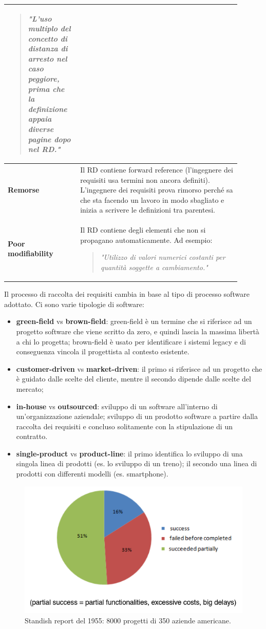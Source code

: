 \documentclass[italian]{article}
\begin{document}
\begin{longtable}{|m{0.27\linewidth}|m{0.63\linewidth}|}
\begin{verse}
				\textit{"L'uso multiplo del concetto di distanza di arresto nel caso peggiore, prima che la definizione appaia diverse pagine dopo nel RD."}
			\end{verse}\\
			\hline
			\textbf{Remorse} & Il RD contiene forward reference (l'ingegnere dei requisiti usa termini non ancora definiti). L'ingegnere dei requisiti prova rimorso perché sa che sta facendo un lavoro in modo sbagliato e inizia a scrivere le definizioni tra parentesi.\\
			\hline
			\textbf{Poor modifiability} & Il RD contiene degli elementi che non si propagano automaticamente. Ad esempio:
			\begin{verse}
				\textit{"Utilizzo di valori numerici costanti per quantità soggette a cambiamento."}
			\end{verse}
			\\
			\hline
		\end{longtable}
		Il processo di raccolta dei requisiti cambia in base al tipo di processo software adottato. Ci sono varie tipologie di software:
		\begin{itemize}
			\item \textbf{green-field} vs \textbf{brown-field}: green-field è un termine che si riferisce ad un progetto software che viene scritto da zero, e quindi lascia la massima libertà a chi lo progetta; brown-field è usato per identificare i sistemi legacy e di conseguenza vincola il progettista al contesto esistente.
			\item \textbf{customer-driven} vs \textbf{market-driven}: il primo si riferisce ad un progetto che è guidato dalle scelte del cliente, mentre il secondo dipende dalle scelte del mercato;
			\item \textbf{in-house} vs \textbf{outsourced}: sviluppo di un software all'interno di un'organizzazione aziendale; sviluppo di un prodotto software a partire dalla raccolta dei requisiti e concluso solitamente con la stipulazione di un contratto.
			\item \textbf{single-product} vs \textbf{product-line}: il primo identifica lo sviluppo di una singola linea di prodotti (es. lo sviluppo di un treno); il secondo una linea di prodotti con differenti modelli (es. smartphone).
		\end{itemize}
		\begin{figure}[th]
			\centering
			\includegraphics[width=0.7\linewidth]{img/grafico-torta-problema-requisiti-1955}
			\caption{Standish report del 1955: 8000 progetti di 350 aziende americane.}
			\label{fig:grafico-torta-problema-requisiti-1955}
		\end{figure}
\end{document}
